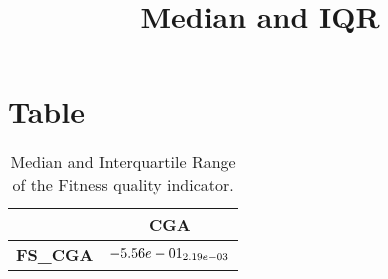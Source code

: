 \documentclass{article}
\title{Median and IQR}
\author{}
\begin{document}
\maketitle
\section{Table}
\begin{table}[!htp]
  \caption{Median and Interquartile Range of the Fitness quality indicator.}
  \label{table:Fitness}
  \centering
  \begin{scriptsize}
  \begin{tabular}{c|c}
      & \textbf{CGA} \\\hline
      \textbf{FS_CGA} & $\cellcolor{gray95} \cellcolor{gray25} -5.56e-01_{2.19e-03}$ \\
  \end{tabular}
  \end{scriptsize}
\end{table}
\end{document}
